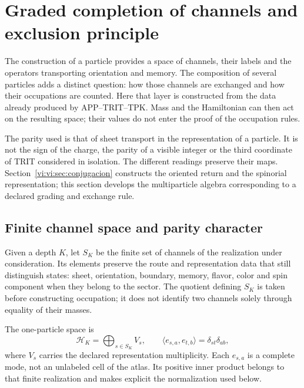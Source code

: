 \section{Graded completion of channels and exclusion principle}
\label{vi:vi:sec:fock-pauli}

The construction of a particle provides a space of channels, their
labels and the operators transporting orientation and memory. The
composition of several particles adds a distinct question: how those
channels are exchanged and how their occupations are counted. Here that
layer is constructed from the data already produced by
APP--TRIT--TPK. Mass and the Hamiltonian can then act on
the resulting space; their values do not enter the proof of
the occupation rules.

The parity used is that of sheet transport in the representation
of a particle. It is not the sign of the charge, the parity of a visible
integer or the third coordinate of TRIT considered in isolation.
The different readings preserve their maps.
Section~\ref{vi:vi:sec:conjugacion} constructs the oriented return and the
spinorial representation; this section develops the multiparticle
algebra corresponding to a declared grading and exchange
rule.

\subsection{Finite channel space and parity character}
\label{vi:vi:subsec:canales-graduados}

Given a depth \(K\), let \(S_K\) be the finite set of
channels of the realization under consideration. Its elements preserve the
route and representation data that still distinguish states:
sheet, orientation, boundary, memory, flavor, color and spin
component when they belong to the sector. The quotient defining \(S_K\)
is taken before constructing occupation; it does not identify two channels
solely through equality of their masses.

The one-particle space is
\begin{equation}
 \mathcal H_K=\bigoplus_{s\in S_K}V_s,
 \qquad\langle e_{s,a},e_{t,b}\rangle=\delta_{st}\delta_{ab},
 \label{vi:vi:eq:espacio-canales-fock}
\end{equation}
where \(V_s\) carries the declared representation multiplicity.
Each \(e_{s,a}\) is a complete mode, not an unlabeled cell of the
atlas. Its positive inner product belongs to that finite
realization and makes explicit the normalization used below.

